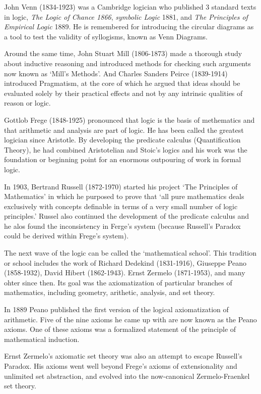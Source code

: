 \documentclass[]{book}
\theoremstyle{definition}
\theoremstyle{definition}
\theoremstyle{definition}
\theoremstyle{remark}
\begin{document}
John Venn (1834-1923) was a Cambridge logician who published 3 standard
texts in logic, \emph{The Logic of Chance 1866}, \emph{symbolic Logic}
1881, and \emph{The Principles of Empirical Logic} 1889. He is
remembered for introducing the circular diagrams as a tool to test the
validity of syllogisms, known as Venn Diagrams.

Around the same time, John Stuart Mill (1806-1873) made a thorough study
about inductive reasoning and introduced methods for checking such
arguments now known as `Mill's Methods'. And Charles Sanders Peirce
(1839-1914) introduced Pragmatism, at the core of which he argued that
ideas should be evaluated solely by their practical effects and not by
any intrinsic qualities of reason or logic.

Gottlob Frege (1848-1925) pronounced that logic is the basis of
methematics and that arithmetic and analysis are part of logic. He has
been called the greatest logician since Aristotle. By developing the
predicate calculus (Quantification Theory), he had combined Aristotelian
and Stoic's logics and his work was the foundation or beginning point
for an enormous outpouring of work in formal logic.

In 1903, Bertrand Russell (1872-1970) started his project `The
Principles of Mathematics' in which he purposed to prove that `all pure
mathematics deals exclusively with concepts definable in terms of a very
small number of logic principles.' Russel also continued the development
of the predicate calculus and he alos found the inconsistency in Ferge's
system (because Russell's Paradox could be derived within Frege's
system).

The next wave of the logic can be called the `mathematical school'. This
tradition or school includes the work of Richard Dedekind (1831-1916),
Giuseppe Peano (1858-1932), David Hibert (1862-1943). Ernst Zermelo
(1871-1953), and many ohter since then. Its goal was the axiomatization
of particular branches of mathematics, including geometry, arithetic,
analysis, and set theory.

In 1889 Peano published the first version of the logical axiomatization
of arithmetic. Five of the nine axioms he came up with are now known as
the Peano axioms. One of these axioms was a formalized statement of the
principle of mathematical induction.

Ernst Zermelo's axiomatic set theory was also an attempt to escape
Russell's Paradox. His axioms went well beyond Frege's axioms of
extensionality and unlimited set abstraction, and evolved into the
now-canonical Zermelo-Fraenkel set theory.
\end{document}
